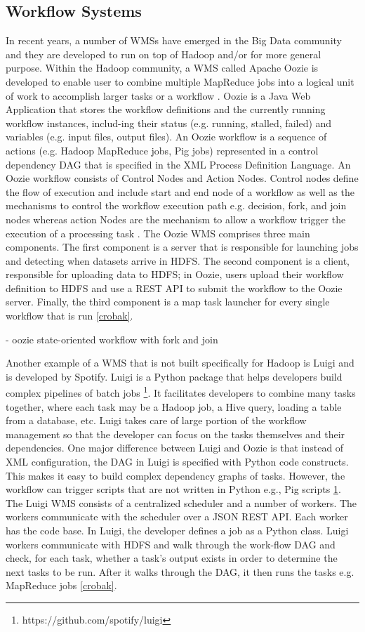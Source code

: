 \subsection{Workflow Systems}
In recent years, a number of WMSs have emerged in the Big Data community and they are developed to run on top of Hadoop and/or for more general purpose. Within the Hadoop community, a WMS called Apache Oozie is developed to enable user to combine multiple MapReduce jobs into a logical unit of work to accomplish larger tasks or a workflow \cite{islam2012oozie}. Oozie is a Java Web Application that stores the workflow definitions and the currently running workflow instances, includ-ing their status (e.g. running, stalled, failed) and variables (e.g. input files, output files). An Oozie workflow is a sequence of actions (e.g. Hadoop MapReduce jobs, Pig jobs) represented in a control dependency DAG that is specified in the XML Process Definition Language. An Oozie workflow consists of Control Nodes and Action Nodes. Control nodes define the flow of execution and include start and end node of a workflow as well as the mechanisms to control the workflow execution path e.g. decision, fork, and join nodes whereas action Nodes are the mechanism to allow a workflow trigger the execution of a processing task \cite{islam2012oozie}. The Oozie WMS comprises three main components. The first component is a server that is responsible for launching jobs and detecting when datasets arrive in HDFS. The second component is a client, responsible for uploading data to HDFS; in Oozie, users upload their workflow definition to HDFS and use a REST API to submit the workflow to the Oozie server. Finally, the third component is a map task launcher for every single workflow that is run \cref{crobak}. 

- oozie state-oriented workflow with fork and join

Another example of a WMS that is not built specifically for Hadoop is Luigi and is developed by Spotify.  Luigi is a Python package that helps developers build complex pipelines of batch jobs \footnote{\label{luigi}https://github.com/spotify/luigi}. It facilitates developers to combine many tasks together, where each task may be a Hadoop job, a Hive query, loading a table from a database, etc. Luigi takes care of large portion of the workflow management so that the developer can focus on the tasks themselves and their dependencies. One major difference between Luigi and Oozie is that instead of XML configuration, the DAG in Luigi is specified with Python code constructs. This makes it easy to build complex dependency graphs of tasks. However, the workflow can trigger scripts that are not written in Python e.g., Pig scripts \cref{luigi}. The Luigi WMS consists of a centralized scheduler and a number of workers. The workers communicate with the scheduler over a JSON REST API. Each worker has the code base. In Luigi, the developer defines a job as a Python class. Luigi workers communicate with HDFS and walk through the work-flow DAG and check, for each task, whether a task’s output exists in order to determine the next tasks to be run. After it walks through the DAG, it then runs the tasks e.g. MapReduce jobs \cref{crobak}. 


